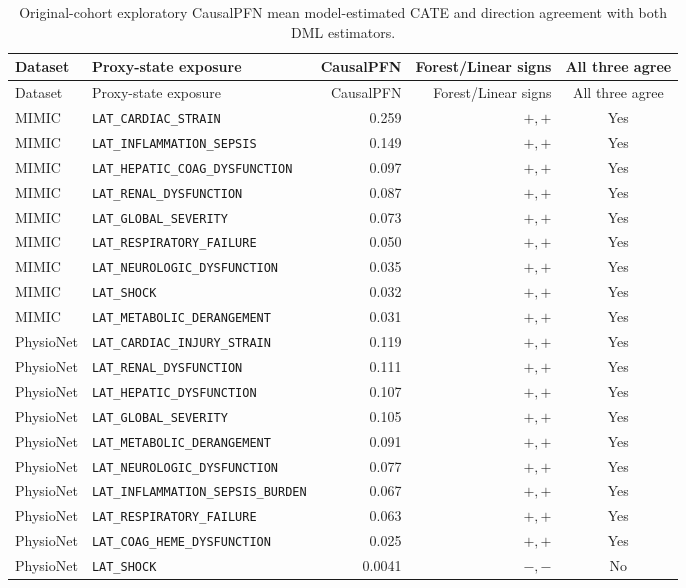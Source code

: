 \begingroup
\scriptsize
\setlength{\tabcolsep}{4pt}
\begin{longtable}{@{}lL{0.43\textwidth}rrc@{}}
\caption[CausalPFN results and DML direction agreement.]{Original-cohort exploratory CausalPFN mean model-estimated CATE and direction agreement with both DML estimators.}
\label{tab:results-pfn-comparison}\\
\toprule
Dataset & Proxy-state exposure & CausalPFN & Forest/Linear signs & All three agree \\
\midrule
\endfirsthead
\toprule
Dataset & Proxy-state exposure & CausalPFN & Forest/Linear signs & All three agree \\
\midrule
\endhead
MIMIC & \nolinkurl{LAT_CARDIAC_STRAIN} & 0.259 & $+,+$ & Yes \\
MIMIC & \nolinkurl{LAT_INFLAMMATION_SEPSIS} & 0.149 & $+,+$ & Yes \\
MIMIC & \nolinkurl{LAT_HEPATIC_COAG_DYSFUNCTION} & 0.097 & $+,+$ & Yes \\
MIMIC & \nolinkurl{LAT_RENAL_DYSFUNCTION} & 0.087 & $+,+$ & Yes \\
MIMIC & \nolinkurl{LAT_GLOBAL_SEVERITY} & 0.073 & $+,+$ & Yes \\
MIMIC & \nolinkurl{LAT_RESPIRATORY_FAILURE} & 0.050 & $+,+$ & Yes \\
MIMIC & \nolinkurl{LAT_NEUROLOGIC_DYSFUNCTION} & 0.035 & $+,+$ & Yes \\
MIMIC & \nolinkurl{LAT_SHOCK} & 0.032 & $+,+$ & Yes \\
MIMIC & \nolinkurl{LAT_METABOLIC_DERANGEMENT} & 0.031 & $+,+$ & Yes \\
\addlinespace
PhysioNet & \nolinkurl{LAT_CARDIAC_INJURY_STRAIN} & 0.119 & $+,+$ & Yes \\
PhysioNet & \nolinkurl{LAT_RENAL_DYSFUNCTION} & 0.111 & $+,+$ & Yes \\
PhysioNet & \nolinkurl{LAT_HEPATIC_DYSFUNCTION} & 0.107 & $+,+$ & Yes \\
PhysioNet & \nolinkurl{LAT_GLOBAL_SEVERITY} & 0.105 & $+,+$ & Yes \\
PhysioNet & \nolinkurl{LAT_METABOLIC_DERANGEMENT} & 0.091 & $+,+$ & Yes \\
PhysioNet & \nolinkurl{LAT_NEUROLOGIC_DYSFUNCTION} & 0.077 & $+,+$ & Yes \\
PhysioNet & \nolinkurl{LAT_INFLAMMATION_SEPSIS_BURDEN} & 0.067 & $+,+$ & Yes \\
PhysioNet & \nolinkurl{LAT_RESPIRATORY_FAILURE} & 0.063 & $+,+$ & Yes \\
PhysioNet & \nolinkurl{LAT_COAG_HEME_DYSFUNCTION} & 0.025 & $+,+$ & Yes \\
PhysioNet & \nolinkurl{LAT_SHOCK} & 0.0041 & $-,-$ & No \\
\bottomrule
\end{longtable}
\endgroup

